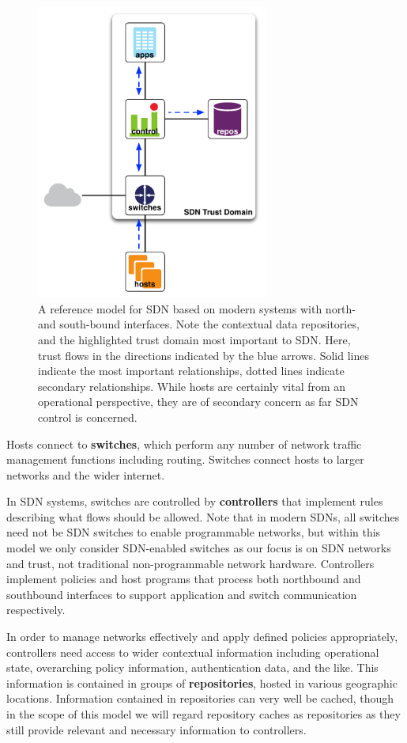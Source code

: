 \documentclass[10pt,conference]{IEEEtran}
\begin{document}
\begin{figure}[!t]
\centering
\includegraphics[width=3.0in]{images/reference-model.pdf}
\caption{A reference model for SDN based on modern systems with north- and south-bound interfaces.  Note the contextual data repositories, and the highlighted trust domain most important to SDN.  Here, trust flows in the directions indicated by the blue arrows.  Solid lines indicate the most important relationships, dotted lines indicate secondary relationships.  While hosts are certainly vital from an operational perspective, they are of secondary concern as far SDN control is concerned.}
\label{fig:reference-model}
\end{figure}

Hosts connect to {\bf switches}, which perform any number of network traffic management functions including routing.  Switches connect hosts to larger networks and the wider internet.  

In SDN systems, switches are controlled by {\bf controllers} that implement rules describing what flows should be allowed.  Note that in modern SDNs, all switches need not be SDN switches to enable programmable networks, but within this model we only consider SDN-enabled switches as our focus is on SDN networks and trust, not traditional non-programmable network hardware.  Controllers implement policies and host programs that process both northbound and southbound interfaces to support application and switch communication respectively.  

In order to manage networks effectively and apply defined policies appropriately, controllers need access to wider contextual information including operational state, overarching policy information, authentication data, and the like.  This information is contained in groups of {\bf repositories}, hosted in various geographic locations.  Information contained in repositories can very well be cached, though in the scope of this model we will regard repository caches as repositories as they still provide relevant and necessary information to controllers.  
\end{document}
